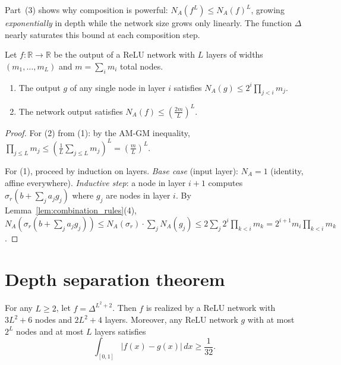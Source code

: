 \begin{remark}\label{rem:composition_power}
  Part~(3) shows why composition is powerful: $N_A(f^L) \leq N_A(f)^L$, growing
  \emph{exponentially} in depth while the network size grows only linearly.
  The function $\Delta$ nearly saturates this bound at each composition step.
\end{remark}

\begin{lemma}\label{lem:numAffinePieces_network}
Let $f : \mathbb{R} \to \mathbb{R}$ be the output of a ReLU network with $L$ layers of widths
$(m_1, \ldots, m_L)$ and $m = \sum_i m_i$ total nodes.
\begin{enumerate}
  \item The output $g$ of any single node in layer $i$ satisfies
    $N_A(g) \leq 2^i \prod_{j < i} m_j$.
  \item The network output satisfies $N_A(f) \leq \left(\frac{2m}{L}\right)^L$.
\end{enumerate}
\end{lemma}

\begin{proof}
  For (2) from (1): by the AM-GM inequality,
  $\prod_{j \leq L} m_j \leq \left(\frac{1}{L}\sum_{j \leq L} m_j\right)^L = \left(\frac{m}{L}\right)^L$.

  For (1), proceed by induction on layers.
  \emph{Base case} (input layer): $N_A = 1$ (identity, affine everywhere).
  \emph{Inductive step}: a node in layer $i+1$ computes $\sigma_r(b + \sum_j a_j g_j)$
  where $g_j$ are nodes in layer $i$. By Lemma~\ref{lem:combination_rules}(4),
  $N_A(\sigma_r(b + \sum_j a_j g_j)) \leq N_A(\sigma_r) \cdot \sum_j N_A(g_j)
  \leq 2 \sum_j 2^i \prod_{k<i} m_k = 2^{i+1} m_i \prod_{k<i} m_k$.
\end{proof}

\section{Depth separation theorem}\label{sec:separation}

\begin{theorem}\label{thm:depthSeparation}
For any $L \geq 2$, let $f = \Delta^{L^2+2}$.
Then $f$ is realized by a ReLU network with $3L^2+6$ nodes and $2L^2+4$ layers.
Moreover, any ReLU network $g$ with at most $2^L$ nodes and at most $L$ layers satisfies
\[
  \int_{[0,1]} |f(x) - g(x)| \, dx \geq \frac{1}{32}.
\]
\end{theorem}

